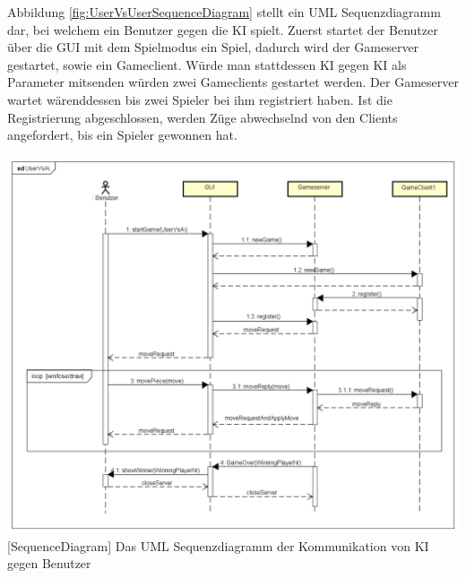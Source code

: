 \documentclass[12pt,a4paper,bibliography=totocnumbered,listof=totocnumbered]{article}
\begin{document}
Abbildung \ref{fig:UserVsUserSequenceDiagram} stellt ein UML Sequenzdiagramm dar, bei welchem ein Benutzer gegen die KI spielt.
Zuerst startet der Benutzer über die GUI mit dem Spielmodus ein Spiel, dadurch wird der Gameserver gestartet, sowie ein
Gameclient. Würde man stattdessen KI gegen KI als Parameter mitsenden würden zwei Gameclients gestartet werden. 
Der Gameserver wartet wärenddessen bis zwei Spieler bei ihm registriert haben. Ist die Registrierung abgeschlossen, werden Züge
abwechselnd von den Clients angefordert, bis ein Spieler gewonnen hat.

\vspace{1em}
\begin{minipage}{\linewidth}
	\centering
	\includegraphics[width=0.83\linewidth]{pics/UserVsAiCommunication.png}
	[SequenceDiagram]{ Das UML Sequenzdiagramm der Kommunikation von KI gegen Benutzer}
	\label{fig:UserVsUserSequenceDiagram}
\end{minipage}
\end{document}
